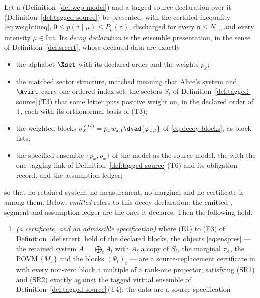 \begin{corollary}\label{cor:emitted-decoy}
Let a  (Definition~\ref{def:wcp-model}) and a tagged
source declaration over it (Definition~\ref{def:tagged-source}) be presented,
with the certified inequality \eqref{eq:weightineq},
$0\le\tilde p(\mathsf{n}\mid\mu)\le P_\mu(\mathsf{n})$, discharged for every
$\mathsf{n}\le N_{\mathrm{src}}$ and every intensity $\mu\in\mathrm{Int}$. Its
\emph{decoy declaration} is the ensemble presentation, in the sense of
Definition~\ref{def:srcert}, whose declared data are exactly
\begin{itemize}[leftmargin=1.6em]
\item the alphabet $\Xset$ with its declared order and the weights $p_x$;
\item the matched sector structure, matched meaning that Alice's system and
  $\Avirt$ carry one ordered index set: the sectors $S_t$ of
  Definition~\ref{def:tagged-source}\,(T3) that some letter puts positive
  weight on, in the declared order of $\mathbb{T}$, each with its orthonormal
  basis of (T3);
\item the weighted blocks $\sigma^{\mathrm v,(t)}_x=p_xw_{x,t}
  \dyad{\varphi_{x,t}}$ of \eqref{eq:decoy-blocks}, as block lists;
\item the specified ensemble $\{p_x,\rho_x\}$ of the model as the source model,
  the  with the one tagging link of
  Definition~\ref{def:tagged-source}\,(T6) and its obligation record, and the
  assumption ledger;
\end{itemize}
so that no retained system, no measurement, no marginal and no certificate is
among them. Below, \emph{emitted} refers to this decoy declaration: the emitted
, segment and assumption ledger are the ones it
declares. Then
the following hold.
\begin{enumerate}[label=(\roman*),leftmargin=3.0em]
\item \emph{(a certificate, and an admissible specification)} where (E1) to
(E3) of Definition~\ref{def:srcert} hold of the declared blocks, the objects
\eqref{eq:enspres} --- the retained system $A=\bigoplus_tA_t$ with $A_t$ a copy
of $S_t$, the marginal $\tau_A$, the POVM $\{M_x\}$ and the blocks
$(\Psi_t)_t$ --- are a source-replacement certificate in 
with every non-zero block a multiple of a rank-one projector, satisfying (SR1)
and (SR2) exactly against the tagged virtual ensemble of
Definition~\ref{def:tagged-source}\,(T4); the data are a source specification

\end{enumerate}
\end{corollary}
